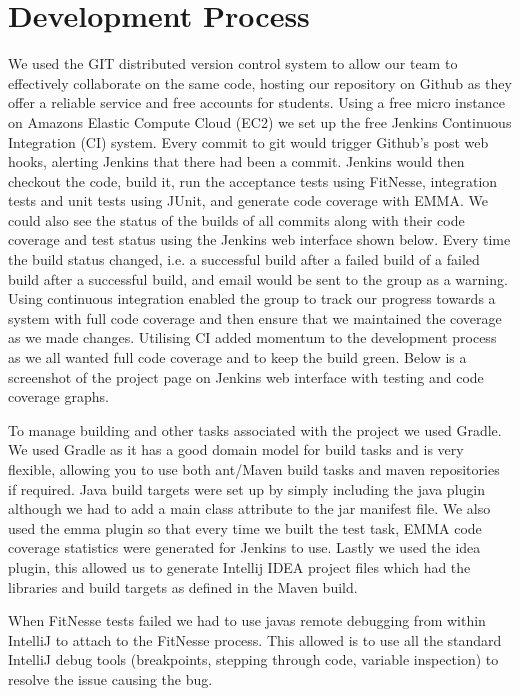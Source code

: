 \documentclass[a4paper,11pt]{article}
\begin{document}
\section{Development Process}
We used the GIT distributed version control system to allow our team to effectively collaborate on the same code, hosting our repository on Github as they offer a reliable service and free accounts for students. Using a free micro instance on Amazons Elastic Compute Cloud (EC2) we set up the free Jenkins Continuous Integration (CI) system. Every commit to git would trigger Github's post web hooks, alerting Jenkins that there had been a commit. Jenkins would then checkout the code, build it, run the acceptance tests using FitNesse, integration tests and unit tests using JUnit, and generate code coverage with EMMA. We could also see the status of the builds of all commits along with their code coverage and test status using the Jenkins web interface shown below. Every time the build status changed, i.e. a successful build after a failed build of a failed build after a successful build, and email would be sent to the group as a warning. Using continuous integration enabled the group to track our progress towards a system with full code coverage and then ensure that we maintained the coverage as we made changes. Utilising CI added momentum to the development process as we all wanted full code coverage and to keep the build green. Below is a screenshot of the project page on Jenkins web interface with testing and code coverage graphs.

To manage building and other tasks associated with the project we used Gradle. We used Gradle as it has a good domain model for build tasks and is very flexible, allowing you to use both ant/Maven build tasks and maven repositories if required. Java build targets were set up by simply including the java plugin although we had to add a main class attribute to the jar manifest file. We also used the emma plugin so that every time we built the test task, EMMA code coverage statistics were generated for Jenkins to use. Lastly we used the idea plugin, this allowed us to generate Intellij IDEA project files which had the libraries and build targets as defined in the Maven build. 

When FitNesse tests failed we had to use javas remote debugging from within IntelliJ to attach to the FitNesse process. This allowed is to use all the standard IntelliJ debug tools (breakpoints, stepping through code, variable inspection) to resolve the issue causing the bug.
\end{document}
